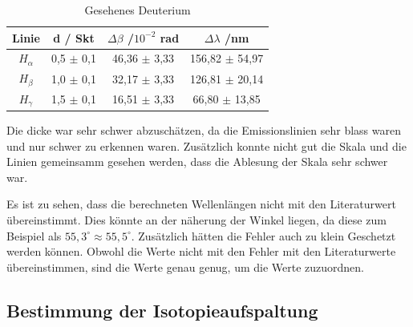 \begin{table}[htbp]
    \centering
    \begin{tabular}{|c|c|c|c|}
        Linie & d / Skt & $\Delta \beta$ /$10^{-2}$ rad & $\Delta \lambda$ /nm \\
        \hline
        $H_\alpha$ & 0,5 $\pm$ 0,1 & 46,36 $\pm$ 3,33 & 156,82 $\pm$ 54,97 \\
        $H_\beta$ & 1,0 $\pm$ 0,1 & 32,17 $\pm$ 3,33 & 126,81 $\pm$ 20,14 \\
        $H_\gamma$ & 1,5 $\pm$ 0,1 & 16,51 $\pm$ 3,33 & 66,80 $\pm$ 13,85 \\


    \end{tabular}
    \caption{Gesehenes Deuterium}
    \label{tab: gesehenes deut}
\end{table}

Die dicke war sehr schwer abzuschätzen, da die Emissionslinien sehr blass waren und nur schwer zu erkennen waren.
Zusätzlich konnte nicht gut die Skala und die Linien gemeinsamm gesehen werden, dass die Ablesung der Skala sehr schwer war.

Es ist zu sehen, dass die berechneten Wellenlängen nicht mit den Literaturwert übereinstimmt. 
Dies könnte an der näherung der Winkel liegen, da diese zum Beispiel als $55,3^\circ \approx 55,5^\circ$.
Zusätzlich hätten die Fehler auch zu klein Geschetzt werden können.
Obwohl die Werte nicht mit den Fehler mit den Literaturwerte übereinstimmen, sind die Werte genau genug, um die Werte zuzuordnen. 


\subsection{Bestimmung der Isotopieaufspaltung}

